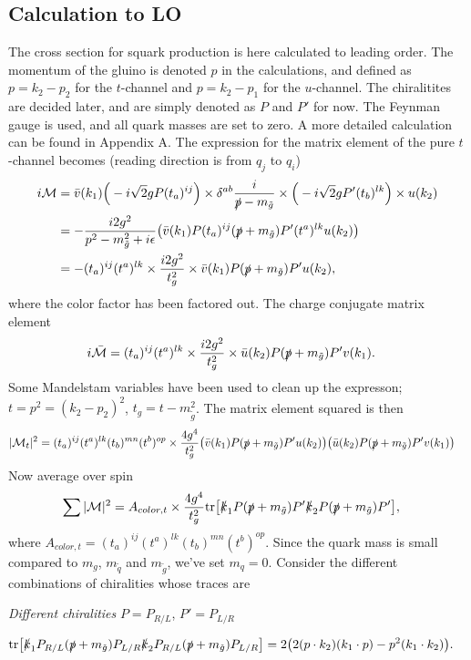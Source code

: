 \documentclass[twoside,english]{uiofysmaster}
\begin{document}
\subsection{Calculation to LO}

The cross section for squark production is here calculated to leading order. The momentum of the gluino is denoted $p$ in the calculations, and defined as $p= k_2-p_2 $ for the $t$-channel and $p=k_2-p_1$ for the $u$-channel. The chiralitites are decided later, and are simply denoted as $P$ and $P'$ for now. The Feynman gauge is used, and all quark masses are set to zero. A more detailed calculation can be found in Appendix A. The expression for the matrix element of the pure $t$-channel becomes (reading direction is from $q_j$ to $q_i$)
\begin{align*}
i \mathcal{M} &= \bar{v} (k_1) \Big( -i \sqrt{2} g P (t_a)^{ij}\Big) \times \delta^{ab} \frac{i}{\slashed{p} - m_{\tilde{g}}} \times \Big( -i \sqrt{2} gP'(t_b)^{lk} \Big) \times u(k_2)\\
&= - \frac{i 2 g^2}{p^2 - m_{\tilde{g}}^2 + i \epsilon}\big( \bar{v} (k_1)  P (t_a)^{ij}(\slashed{p} + m_{\tilde{g}}) P'(t^a)^{lk} u(k_2) \big)\\
&= - (t_a)^{ij}(t^a)^{lk} \times \frac{i 2 g^2}{t_g^2} \times  \bar{v} (k_1)  P (\slashed{p} + m_{\tilde{g}}) P' u(k_2) ,
\end{align*}
where the color factor has been factored out. The charge conjugate matrix element
\begin{align*}
i \mathcal{\bar{M}} & = (t_a)^{ij}(t^a)^{lk} \times \frac{i 2 g^2}{t_g^2} \times \bar{u} (k_2)  P (\slashed{p} + m_{\tilde{g}}) P' v(k_1) .
\end{align*}
Some Mandelstam variables have been used to clean up the expresson; $t= p^2 = (k_2 - p_2)^2$, $t_g = t - m_{\tilde{g}}^2$. The matrix element squared is then
\begin{align*}
|\mathcal{M}_t|^2 &=  (t_a)^{ij} (t^a)^{lk} (t_b)^{mn} (t^b)^{op} \times \frac{4 g^4}{t_g^2}
\big( \bar{v} (k_1)  P (\slashed{p} + m_{\tilde{g}}) P' u(k_2) \big)
\big( \bar{u} (k_2)  P (\slashed{p} + m_{\tilde{g}}) P' v(k_1) \big)
\end{align*}
Now average over spin
\begin{align*}
\sum |\mathcal{M}|^2 &= A_{color, t} \times \frac{4 g^4}{t_g^2} \text{tr} \big[ 
\slashed{k}_1 P (\slashed{p} + m_{\tilde{g}}) P' \slashed{k}_2 P (\slashed{p} + m_{\tilde{g}}) P' \big],
\end{align*}
where $A_{color, t}= (t_a)^{ij} (t^a)^{lk} (t_b)^{mn} (t^b)^{op}$. Since the quark mass is small compared to $m_g$, $m_{\tilde{q}}$ and $m_{\tilde{g}}$, we've set $m_q=0$.
Consider the different combinations of chiralities whose traces are
\begin{center}
\textit{Different chiralities }$P=P_{R/L}$, $P'=P_{L/R}$
\end{center}
\begin{align}\label{Eq:: susy hadron : calc chiralities}
\text{tr} \big[ 
\slashed{k}_1 P_{R/L} (\slashed{p} + m_{\tilde{g}}) P_{L/R} \slashed{k}_2 P_{R/L} (\slashed{p} + m_{\tilde{g}}) P_{L/R} \big]
&= 2 \big(
2 (p \cdot k_2) (k_1 \cdot p) - p^2 (k_1 \cdot k_2)\big).
\end{align}
\end{document}
